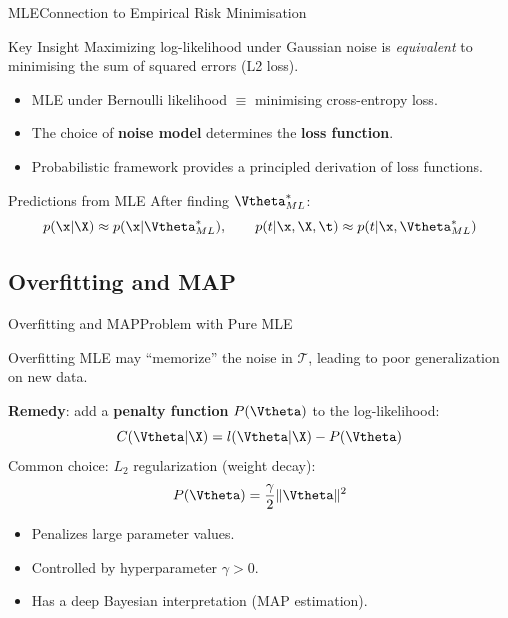 \begin{frame}{MLE}{Connection to Empirical Risk Minimisation}
  \begin{alertblock}{Key Insight}
    Maximizing log-likelihood under Gaussian noise is \emph{equivalent} to minimising the sum of squared errors (L2 loss).
  \end{alertblock}

  \begin{itemize}
    \item MLE under Bernoulli likelihood $\equiv$ minimising cross-entropy loss.
    \item The choice of \textbf{noise model} determines the \textbf{loss function}.
    \item Probabilistic framework provides a principled derivation of loss functions.
  \end{itemize}

  \begin{block}{Predictions from MLE}
    After finding $\Vtheta^*_{ML}$:
    \[
      p(\x|\X) \approx p(\x|\Vtheta^*_{ML}), \qquad p(t|\x,\X,\t) \approx p(t|\x,\Vtheta^*_{ML})
    \]
  \end{block}
\end{frame}

\subsection{Overfitting and MAP}

\begin{frame}{Overfitting and MAP}{Problem with Pure MLE}
  \begin{alertblock}{Overfitting}
    MLE may ``memorize'' the noise in $\mathcal{T}$, leading to poor generalization on new data.
  \end{alertblock}

  \textbf{Remedy}: add a \textbf{penalty function} $P(\Vtheta)$ to the log-likelihood:
  \[
    C(\Vtheta|\X) = l(\Vtheta|\X) - P(\Vtheta)
  \]
  Common choice: $L_2$ regularization (weight decay):
  \[
    P(\Vtheta) = \frac{\gamma}{2}\|\Vtheta\|^2
  \]

  \begin{itemize}
    \item Penalizes large parameter values.
    \item Controlled by hyperparameter $\gamma > 0$.
    \item Has a deep Bayesian interpretation (MAP estimation).
  \end{itemize}
\end{frame}

